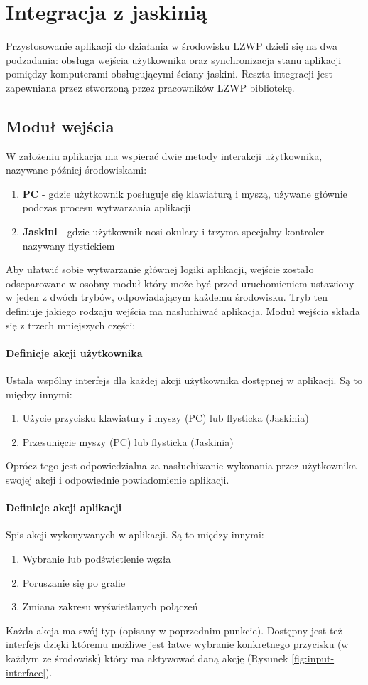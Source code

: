 \section{Integracja z jaskinią}
Przystosowanie aplikacji do działania w środowisku LZWP dzieli się na dwa podzadania: obsługa wejścia użytkownika oraz synchronizacja stanu aplikacji pomiędzy komputerami obsługującymi ściany jaskini. Reszta integracji jest zapewniana przez stworzoną przez pracowników LZWP bibliotekę.

\subsection{Moduł wejścia}
W założeniu aplikacja ma wspierać dwie metody interakcji użytkownika, nazywane później środowiskami:
\begin{enumerate}[label=\textbullet]
	\item \textbf{PC} - gdzie użytkownik posługuje się klawiaturą i myszą, używane głównie podczas procesu wytwarzania aplikacji
	\item \textbf{Jaskini} - gdzie użytkownik nosi okulary i trzyma specjalny kontroler nazywany flystickiem
\end{enumerate}
Aby ułatwić sobie wytwarzanie głównej logiki aplikacji, wejście zostało odseparowane w osobny moduł który może być przed uruchomieniem ustawiony w jeden z dwóch trybów, odpowiadającym każdemu środowisku. Tryb ten definiuje jakiego rodzaju wejścia ma nasłuchiwać aplikacja. Moduł wejścia składa się z trzech mniejszych części:
\paragraph{Definicje akcji użytkownika}
Ustala wspólny interfejs dla każdej akcji użytkownika dostępnej w aplikacji. Są to między innymi: 
\begin{enumerate}[label=\textbullet]
	\item Użycie przycisku klawiatury i myszy (PC) lub flysticka (Jaskinia)
	\item Przesunięcie myszy (PC) lub flysticka (Jaskinia)
\end{enumerate}
Oprócz tego jest odpowiedzialna za nasłuchiwanie wykonania przez użytkownika swojej akcji i odpowiednie powiadomienie aplikacji.

\paragraph{Definicje akcji aplikacji}
Spis akcji wykonywanych w aplikacji. Są to między innymi: 
\begin{enumerate}[label=\textbullet]
	\item Wybranie lub podświetlenie węzła
	\item Poruszanie się po grafie
	\item Zmiana zakresu wyświetlanych połączeń
\end{enumerate}
Każda akcja ma swój typ (opisany w poprzednim punkcie). Dostępny jest też interfejs dzięki któremu możliwe jest łatwe wybranie konkretnego przycisku (w każdym ze środowisk) który ma aktywować daną akcję (Rysunek \ref{fig:input-interface}).


